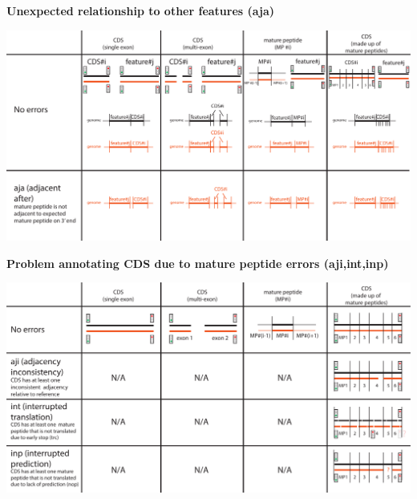 \documentclass[landscape]{slides}
\begin{document}
\begin{slide}
\begin{center}
\textbf{Unexpected relationship to other features (aja)}
\vspace{0.5in}

\includegraphics[width=10in]{figs/error-7-aja}
\end{center}
\vfill
\end{slide}
\begin{slide}
\begin{center}
\textbf{Problem annotating CDS due to mature peptide errors (aji,int,inp)}
\vspace{0.5in}

\includegraphics[width=10in]{figs/error-8-aji-int-inp}
\end{center}
\vfill
\end{slide}
\end{document}
